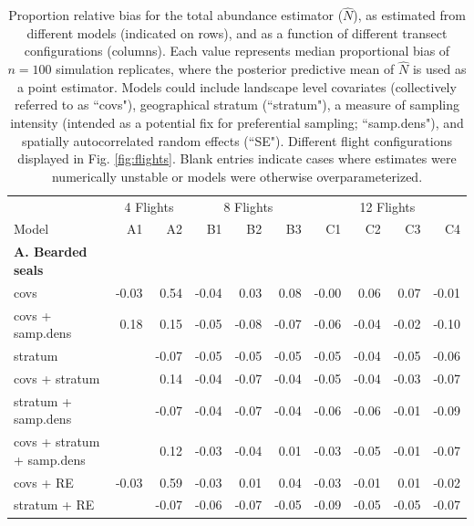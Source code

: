 \documentclass[]{rsos}%
\begin{document}
{\vspace*{-10pt}

\clearpage

\noindent
\begin{table}[ht]
\caption{Proportion relative bias for the total abundance estimator ($\hat{N}$), as estimated from different models (indicated on rows), and as a function of different transect configurations (columns).  Each value represents median proportional bias of $n=100$ simulation replicates, where the posterior predictive mean of $\hat{N}$ is used as a point estimator.  Models could include landscape level covariates (collectively referred to as ``covs"), geographical stratum (``stratum"), a measure of sampling intensity (intended as a potential fix for preferential sampling; ``samp.dens"), and spatially autocorrelated random effects (``SE").  Different flight configurations displayed in Fig. \ref{fig:flights}.  Blank entries indicate cases where estimates were numerically unstable or models were otherwise overparameterized.
}
\label{tab:bias}
\centering
\begin{tabular}{lrrrrrrrrr}
  \hline
   & \multicolumn{2}{c}{4 Flights} & \multicolumn{3}{c}{8 Flights} & \multicolumn{4}{c}{12 Flights} \\
   \cmidrule(lr){2-3} \cmidrule(lr){4-6} \cmidrule(lr){7-10}
Model & A1 & A2 & B1 & B2 & B3 & C1 & C2 & C3 & C4 \\
  \hline
  {\bf A. Bearded seals} & & & & & & & & & \\
covs & -0.03 & 0.54 & -0.04 & 0.03 & 0.08 & -0.00 & 0.06 & 0.07 & -0.01 \\
  covs + samp.dens & 0.18 & 0.15 & -0.05 & -0.08 & -0.07 & -0.06 & -0.04 & -0.02 & -0.10 \\
  stratum &  & -0.07 & -0.05 & -0.05 & -0.05 & -0.05 & -0.04 & -0.05 & -0.06 \\
  covs + stratum &  & 0.14 & -0.04 & -0.07 & -0.04 & -0.05 & -0.04 & -0.03 & -0.07 \\
  stratum + samp.dens &  & -0.07 & -0.04 & -0.07 & -0.04 & -0.06 & -0.06 & -0.01 & -0.09 \\
  covs + stratum + samp.dens &  & 0.12 & -0.03 & -0.04 & 0.01 & -0.03 & -0.05 & -0.01 & -0.07 \\
  covs + RE & -0.03 & 0.59 & -0.03 & 0.01 & 0.04 & -0.03 & -0.01 & 0.01 & -0.02 \\
  stratum + RE &  & -0.07 & -0.06 & -0.07 & -0.05 & -0.09 & -0.05 & -0.05 & -0.07 \\

\end{tabular}
\end{table}}
\end{document}
